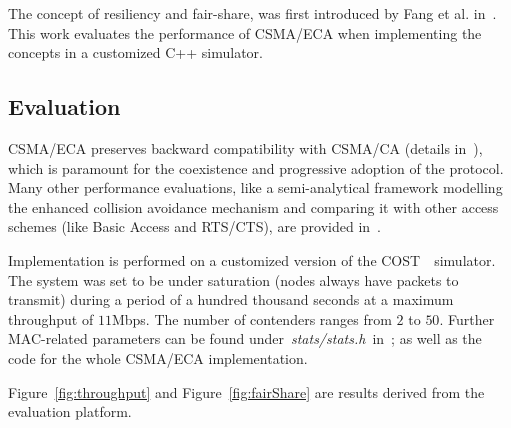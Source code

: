 The concept of resiliency and fair-share, was first introduced by Fang et al. in~\cite{L_MAC}. This work evaluates the performance of CSMA/ECA when implementing the concepts in a customized C++ simulator.


\subsection*{Evaluation}
CSMA/ECA preserves backward compatibility with CSMA/CA (details in~\cite{CSMA_ECA}), which is paramount for the coexistence and progressive adoption of the protocol. Many other performance evaluations, like a semi-analytical framework modelling the enhanced collision avoidance mechanism and comparing it with other access schemes (like Basic Access and RTS/CTS), are provided in~\cite{E2CA_performance}.

Implementation is performed on a customized version of the COST~\cite{COST}~simulator. The system was set to be under saturation (nodes always have packets to transmit) during a period of a hundred thousand seconds at a maximum throughput of $11$Mbps. The number of contenders ranges from $2$ to $50$. Further MAC-related parameters can be found under~\emph{stats/stats.h}~in~\cite{sim:parameters}; as well as the code for the whole CSMA/ECA implementation.

Figure~\ref{fig:throughput} and Figure~\ref{fig:fairShare} are results derived from the evaluation platform.